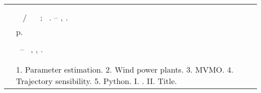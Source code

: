 %
\begin{fichacatalografica}
	\hspace{-1.4cm}
	\imprimirnotaautorizacao \\ \\
	\vspace*{\fill}					%
	\begin{center}					%
		\imprimirnotabib \\
\begin{table}[htb]
	\scriptsize
	\centering	
	\begin{tabular}{|p{0.9cm} p{8.7cm}|}
		\hline
	      & \\
		  &	  \imprimirautorficha     \\
		
		 \imprimircutter & 
							\hspace{0.4cm}\imprimirtitulo~  / ~\imprimirautor~ ;  ~\imprimirorientadorcorpoficha. -- 	\imprimirlocal, \imprimirdata.   \\
		
		   &  %
		
			\hspace{0.4cm}\pageref{LastPage} p.\\ 
		  & \\
		  & 
		    \hspace{0.4cm}\imprimirnotaficha ~--~ 
						  \imprimirunidademin, 
						  \imprimiruniversidademin, 
		                  \imprimirdata. \\ 
		  & \\                 
		  & \\ 
		  & \hspace{0.4cm}1. Parameter estimation. 2. Wind power plants. 3. MVMO. 4. Trajectory sensibility. 5. Python. I. \imprimirorientadorficha. 
		   II. Title. \\
	

\end{tabular}
\end{table}
\end{center}
\end{fichacatalografica}
